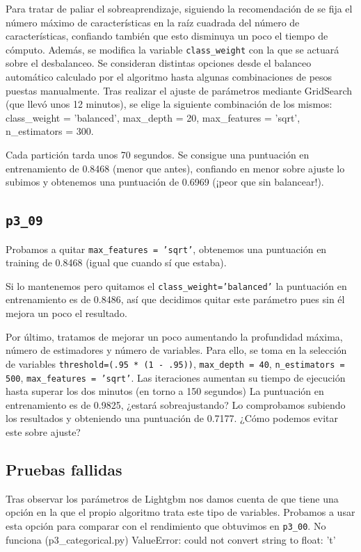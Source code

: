 \documentclass[a4paper, 20pt]{article}
\begin{document}
Para tratar de paliar el sobreaprendizaje, siguiendo la recomendación de %
se fija el número máximo de características en la raíz cuadrada del número de características, confiando también que esto disminuya un poco el tiempo de cómputo. Además, se modifica la variable \texttt{class\_weight} con la que se actuará sobre el desbalanceo. Se consideran distintas opciones desde el balanceo automático calculado por el algoritmo hasta algunas combinaciones de pesos puestas manualmente. Tras realizar el ajuste de parámetros mediante GridSearch (que llevó unos 12 minutos), se elige la siguiente combinación de los mismos: {\ttfamily class\_weight = 'balanced', max\_depth = 20, max\_features = 'sqrt', n\_estimators = 300}.

Cada partición tarda unos 70 segundos. Se consigue una puntuación en entrenamiento de 0.8468 (menor que antes), confiando en menor sobre ajuste lo subimos y obtenemos una puntuación de 0.6969 (¡peor que sin balancear!).

\subsection{\texttt{p3\_09}}
Probamos a quitar \texttt{max\_features = 'sqrt'}, obtenemos una puntuación en training de 0.8468 (igual que cuando sí que estaba).

Si lo mantenemos pero quitamos el \texttt{class\_weight='balanced'} la puntuación en entrenamiento es de 0.8486, así que decidimos quitar este parámetro pues sin él mejora un poco el resultado.

Por último, tratamos de mejorar un poco aumentando la profundidad máxima, número de estimadores y número de variables. Para ello, se toma en la selección de variables \texttt{threshold=(.95 * (1 - .95))}, \texttt{max\_depth = 40}, \texttt{n\_estimators = 500}, \texttt{max\_features = 'sqrt'}. Las iteraciones aumentan su tiempo de ejecución hasta superar los dos minutos (en torno a 150 segundos) La puntuación en entrenamiento es de 0.9825, ¿estará sobreajustando? Lo comprobamos subiendo los resultados y obteniendo una puntuación de 0.7177. ¿Cómo podemos evitar este sobre ajuste?
\subsection{Pruebas fallidas}
Tras observar los parámetros de Lightgbm nos damos cuenta de que tiene una opción en la que el propio algoritmo trata este tipo de variables. Probamos a usar esta opción para comparar con el rendimiento que obtuvimos en \texttt{p3\_00}.
 No funciona (p3\_categorical.py)
 ValueError: could not convert string to float: 't'
\end{document}
